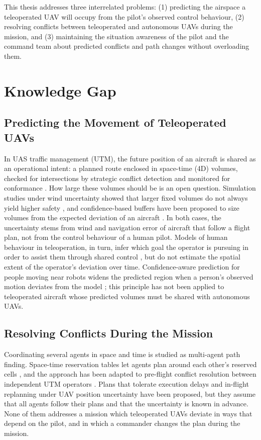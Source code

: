 \documentclass{article}
\begin{document}
This thesis addresses three interrelated problems:
(1) predicting the airspace a teleoperated UAV will occupy from the pilot's observed control behaviour,
(2) resolving conflicts between teleoperated and autonomous UAVs during the mission, and
(3) maintaining the situation awareness of the pilot and the command team about predicted conflicts and path changes without overloading them.

\section{Knowledge Gap}

\subsection{Predicting the Movement of Teleoperated UAVs}
In UAS traffic management (UTM), the future position of an aircraft is shared as an operational intent: a planned route enclosed in space-time (4D) volumes, checked for intersections by strategic conflict detection and monitored for conformance \cite{astmf3548}.
How large these volumes should be is an open question.
Simulation studies under wind uncertainty showed that larger fixed volumes do not always yield higher safety \cite{pradeep2025wind}, and confidence-based buffers have been proposed to size volumes from the expected deviation of an aircraft \cite{cardenas2024confidence}.
In both cases, the uncertainty stems from wind and navigation error of aircraft that follow a flight plan, not from the control behaviour of a human pilot.
Models of human behaviour in teleoperation, in turn, infer which goal the operator is pursuing in order to assist them through shared control \cite{dragan2013policy}, but do not estimate the spatial extent of the operator's deviation over time.
Confidence-aware prediction for people moving near robots widens the predicted region when a person's observed motion deviates from the model \cite{fisac2018confidence}; this principle has not been applied to teleoperated aircraft whose predicted volumes must be shared with autonomous UAVs.

\subsection{Resolving Conflicts During the Mission}
Coordinating several agents in space and time is studied as multi-agent path finding.
Space-time reservation tables let agents plan around each other's reserved cells \cite{silver2005}, and the approach has been adapted to pre-flight conflict resolution between independent UTM operators \cite{ho2022mapf}.
Plans that tolerate execution delays \cite{atzmon2020robust} and in-flight replanning under UAV position uncertainty \cite{chen2025inflight} have been proposed, but they assume that all agents follow their plans and that the uncertainty is known in advance.
None of them addresses a mission which teleoperated UAVs deviate in ways that depend on the pilot, and in which a commander changes the plan during the mission.
\end{document}
